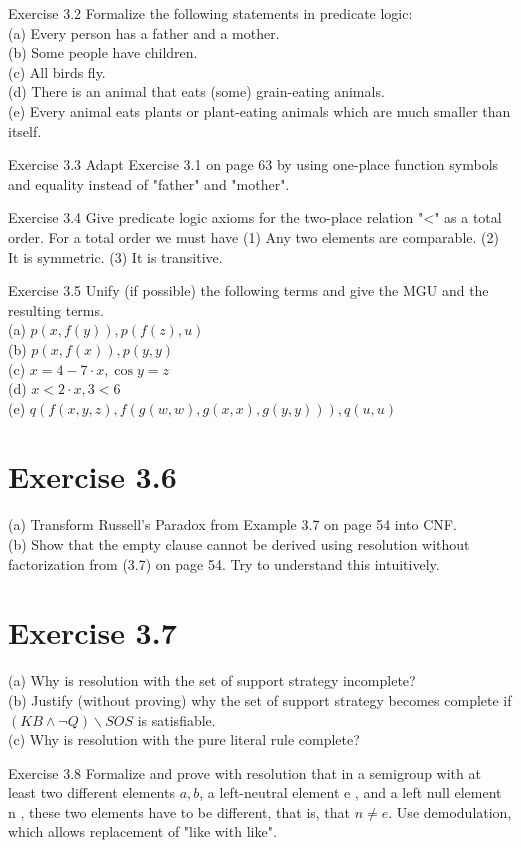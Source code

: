 \documentclass[10pt]{article}
\begin{document}
Exercise 3.2 Formalize the following statements in predicate logic:\\
(a) Every person has a father and a mother.\\
(b) Some people have children.\\
(c) All birds fly.\\
(d) There is an animal that eats (some) grain-eating animals.\\
(e) Every animal eats plants or plant-eating animals which are much smaller than itself.

Exercise 3.3 Adapt Exercise 3.1 on page 63 by using one-place function symbols and equality instead of "father" and "mother".

Exercise 3.4 Give predicate logic axioms for the two-place relation "<" as a total order. For a total order we must have (1) Any two elements are comparable. (2) It is symmetric. (3) It is transitive.

Exercise 3.5 Unify (if possible) the following terms and give the MGU and the resulting terms.\\
(a) $p(x, f(y)), p(f(z), u)$\\
(b) $p(x, f(x)), p(y, y)$\\
(c) $x=4-7 \cdot x, \cos y=z$\\
(d) $x<2 \cdot x, 3<6$\\
(e) $q(f(x, y, z), f(g(w, w), g(x, x), g(y, y))), q(u, u)$

\section*{Exercise 3.6}
(a) Transform Russell's Paradox from Example 3.7 on page 54 into CNF.\\
(b) Show that the empty clause cannot be derived using resolution without factorization from (3.7) on page 54. Try to understand this intuitively.

\section*{Exercise 3.7}
(a) Why is resolution with the set of support strategy incomplete?\\
(b) Justify (without proving) why the set of support strategy becomes complete if $(K B \wedge \neg Q) \backslash S O S$ is satisfiable.\\
(c) Why is resolution with the pure literal rule complete?

Exercise 3.8 Formalize and prove with resolution that in a semigroup with at least two different elements $a, b$, a left-neutral element e , and a left null element n , these two elements have to be different, that is, that $n \neq e$. Use demodulation, which allows replacement of "like with like".
\end{document}
